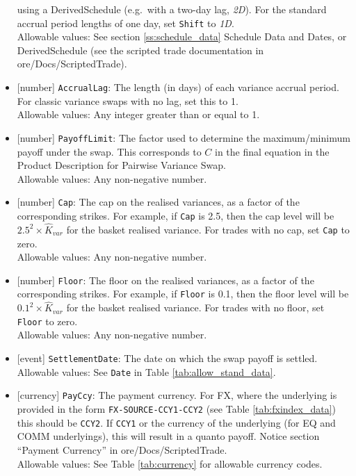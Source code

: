 \begin{itemize}
  using a DerivedSchedule (e.g.\ with a two-day lag, \emph{2D}). For the standard accrual period lengths of one day,
  set \lstinline!Shift! to \emph{1D}. \\
  Allowable values: See section \ref{ss:schedule_data} Schedule Data and Dates, or DerivedSchedule (see the scripted trade documentation in ore/Docs/ScriptedTrade).
  \item{}[number] \lstinline!AccrualLag!: The length (in days) of each variance accrual period. For classic variance swaps with no lag, set this to 1. \\
  Allowable values: Any integer greater than or equal to 1.
  \item{}[number] \lstinline!PayoffLimit!: The factor used to determine the maximum/minimum payoff under the swap. This corresponds to $C$
  in the final equation in the Product Description for Pairwise Variance Swap. \\
  Allowable values: Any non-negative number.
  \item{}[number] \lstinline!Cap!: The cap on the realised variances, as a factor of the corresponding strikes. For example,
  if \lstinline!Cap! is 2.5, then the cap level will be $2.5^2 \times \hat{K}_{var}$ for the basket realised variance.
  For trades with no cap, set \lstinline!Cap! to zero. \\
  Allowable values: Any non-negative number.
  \item{}[number] \lstinline!Floor!: The floor on the realised variances, as a factor of the corresponding strikes. For example,
  if \lstinline!Floor! is 0.1, then the floor level will be $0.1^2 \times \hat{K}_{var}$ for the basket realised variance.
  For trades with no floor, set \lstinline!Floor! to zero. \\
  Allowable values: Any non-negative number.
  \item{}[event] \lstinline!SettlementDate!: The date on which the swap payoff is settled. \\
  Allowable values: See \lstinline!Date! in Table \ref{tab:allow_stand_data}.
  \item{}[currency] \lstinline!PayCcy!: The payment currency. For FX, where the underlying is provided
      in the form \lstinline!FX-SOURCE-CCY1-CCY2! (see Table \ref{tab:fxindex_data}) this should
      be \lstinline!CCY2!. If \lstinline!CCY1! or the currency of the underlying (for EQ and
      COMM underlyings), this will result in a quanto payoff. Notice section ``Payment Currency'' in ore/Docs/ScriptedTrade. \\
        Allowable values: See Table \ref{tab:currency} for allowable currency codes.
\end{itemize}


